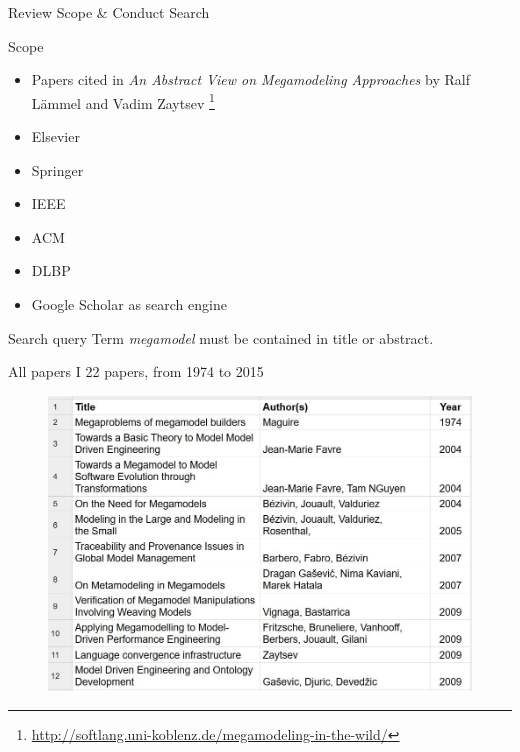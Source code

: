 \documentclass{beamer}
\begin{document}
\begin{frame}{Review Scope \& Conduct Search}

\begin{block}{Scope}
\begin{itemize}
	\item Papers cited in \textit{An Abstract View on Megamodeling Approaches} by Ralf Lämmel and Vadim Zaytsev \footnote{\url{http://softlang.uni-koblenz.de/megamodeling-in-the-wild/}}
	\item Elsevier
	\item Springer
	\item IEEE
	\item ACM
	\item DLBP
	\item Google Scholar as search engine
\end{itemize}
\end{block}

\begin{block}{Search query}
Term \textit{megamodel} must be contained in title or abstract.
\end{block}

\end{frame}

\begin{frame}{All papers I}
22 papers, from 1974 to 2015
\begin{figure}
	\includegraphics[width=1.0\textwidth]{all_papers_1}
\end{figure}
\end{frame}
\end{document}
